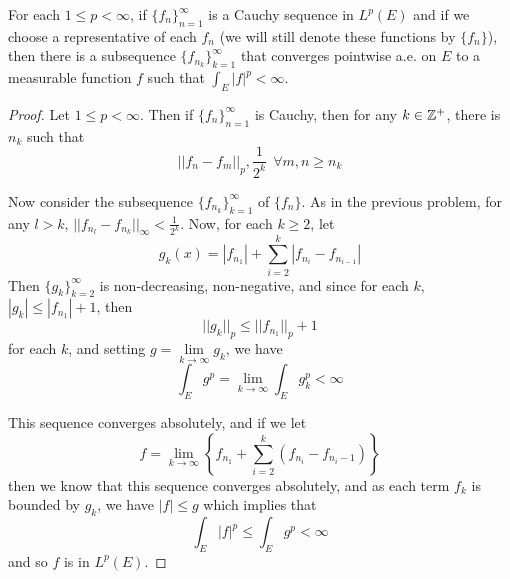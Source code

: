 \begin{pblm}%
	For each $1\le p < \infty$, if $\{f_n\}_{n=1}^\infty$ is a Cauchy sequence in $L^p(E)$ and 
	if we choose a representative of each $f_n$ (we will still denote these functions by $\{f_n\}$), 
	then there is a subsequence $\{f_{n_k}\}_{k=1}^\infty$ that converges pointwise a.e. on $E$ to 
	a measurable function $f$ such that $\int_E|f|^p < \infty$. 
\begin{proof}
	Let $1 \le p < \infty$. Then if $\{f_n\}_{n=1}^\infty$ is Cauchy, then for any $k \in \mathbb{Z}^+$, 
	there is $n_k$ such that 
	\begin{equation*}
		||f_n - f_m||_p , \frac{1}{2^k} ~~ \forall m, n \ge n_k
	\end{equation*}

	Now consider the subsequence $\{f_{n_k}\}_{k=1}^\infty$ of $\{f_n\}$. As in the 
	previous problem, for any $l > k$, $||f_{n_l} - f_{n_k}||_\infty < \frac{1}{2^k}$. 
	Now, for each $k \ge 2$, let 
	\begin{equation*}
		g_k(x) = |f_{n_1}| + \sum\limits_{i=2}^k|f_{n_i} - f_{n_{i-1}}|
	\end{equation*}
	Then $\{g_k\}_{k=2}^\infty$ is non-decreasing, non-negative, and 
	since for each $k$, $|g_k| \le |f_{n_1}| + 1$, then 
	\begin{equation*}
		||g_k||_p \le ||f_{n_1}||_p + 1
	\end{equation*}
	for each $k$, and setting $g = \lim\limits_{k\to\infty}g_k$, we have 
	\begin{equation*}
		\int_Eg^p = \lim\limits_{k\to\infty}\int_Eg^p_k < \infty
	\end{equation*}

	This sequence converges absolutely, and if we let 
	\begin{equation*}
		f = \lim\limits_{k\to\infty}\left\{f_{n_1} + \sum\limits_{i=2}^k(f_{n_i} - f_{n_i - 1})\right\}
	\end{equation*}
	then we know that this sequence converges absolutely, and as each term $f_k$ is bounded by $g_k$, we have 
	$|f| \le g$ which implies that 
	\begin{equation*}
		\int_E|f|^p \le \int_Eg^p < \infty
	\end{equation*}
	and so $f$ is in $L^p(E)$. 
\end{proof}
\end{pblm}


